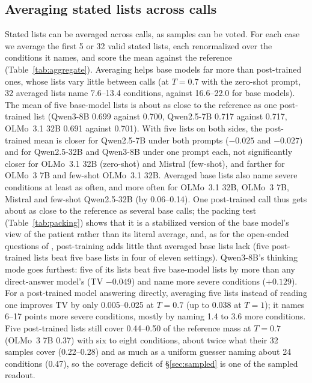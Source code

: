 \documentclass[wcp]{jmlr}
\begin{document}
\subsection{Averaging stated lists across calls}\label{sec:aggregate}
Stated lists can be averaged across calls, as samples can be voted. For each case we average the first 5 or 32 valid stated lists, each renormalized over the conditions it names, and score the mean against the reference (Table~\ref{tab:aggregate}). Averaging helps base models far more than post-trained ones, whose lists vary little between calls (at $T{=}0.7$ with the zero-shot prompt, 32 averaged lists name 7.6--13.4 conditions, against 16.6--22.0 for base models). The mean of five base-model lists is about as close to the reference as one post-trained list (Qwen3-8B 0.699 against 0.700, Qwen2.5-7B 0.717 against 0.717, OLMo~3.1 32B 0.691 against 0.701). With five lists on both sides, the post-trained mean is closer for Qwen2.5-7B under both prompts ($-0.025$ and $-0.027$) and for Qwen2.5-32B and Qwen3-8B under one prompt each, not significantly closer for OLMo~3.1 32B (zero-shot) and Mistral (few-shot), and farther for OLMo~3 7B and few-shot OLMo~3.1 32B. Averaged base lists also name severe conditions at least as often, and more often for OLMo~3.1 32B, OLMo~3 7B, Mistral and few-shot Qwen2.5-32B (by 0.06--0.14). One post-trained call thus gets about as close to the reference as several base calls; the packing test (Table~\ref{tab:packing}) shows that it is a stabilized version of the base model's view of the patient rather than its literal average, and, as for the open-ended questions of \citet{lake2025overton}, post-training adds little that averaged base lists lack (five post-trained lists beat five base lists in four of eleven settings). Qwen3-8B's thinking mode goes furthest: five of its lists beat five base-model lists by more than any direct-answer model's (TV $-0.049$) and name more severe conditions ($+0.129$). For a post-trained model answering directly, averaging five lists instead of reading one improves TV by only 0.005--0.025 at $T{=}0.7$ (up to 0.038 at $T{=}1$); it names 6--17 points more severe conditions, mostly by naming 1.4 to 3.6 more conditions. Five post-trained lists still cover 0.44--0.50 of the reference mass at $T{=}0.7$ (OLMo~3 7B 0.37) with six to eight conditions, about twice what their 32 samples cover (0.22--0.28) and as much as a uniform guesser naming about 24 conditions (0.47), so the coverage deficit of \S\ref{sec:sampled} is one of the sampled readout.
\end{document}

